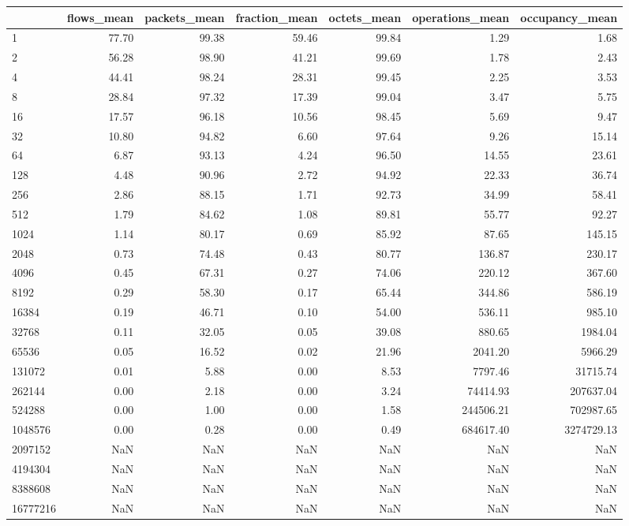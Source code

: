 \begin{tabular}{lrrrrrr}
\toprule
 & flows_mean & packets_mean & fraction_mean & octets_mean & operations_mean & occupancy_mean \\
\midrule
1 & 77.70 & 99.38 & 59.46 & 99.84 & 1.29 & 1.68 \\
2 & 56.28 & 98.90 & 41.21 & 99.69 & 1.78 & 2.43 \\
4 & 44.41 & 98.24 & 28.31 & 99.45 & 2.25 & 3.53 \\
8 & 28.84 & 97.32 & 17.39 & 99.04 & 3.47 & 5.75 \\
16 & 17.57 & 96.18 & 10.56 & 98.45 & 5.69 & 9.47 \\
32 & 10.80 & 94.82 & 6.60 & 97.64 & 9.26 & 15.14 \\
64 & 6.87 & 93.13 & 4.24 & 96.50 & 14.55 & 23.61 \\
128 & 4.48 & 90.96 & 2.72 & 94.92 & 22.33 & 36.74 \\
256 & 2.86 & 88.15 & 1.71 & 92.73 & 34.99 & 58.41 \\
512 & 1.79 & 84.62 & 1.08 & 89.81 & 55.77 & 92.27 \\
1024 & 1.14 & 80.17 & 0.69 & 85.92 & 87.65 & 145.15 \\
2048 & 0.73 & 74.48 & 0.43 & 80.77 & 136.87 & 230.17 \\
4096 & 0.45 & 67.31 & 0.27 & 74.06 & 220.12 & 367.60 \\
8192 & 0.29 & 58.30 & 0.17 & 65.44 & 344.86 & 586.19 \\
16384 & 0.19 & 46.71 & 0.10 & 54.00 & 536.11 & 985.10 \\
32768 & 0.11 & 32.05 & 0.05 & 39.08 & 880.65 & 1984.04 \\
65536 & 0.05 & 16.52 & 0.02 & 21.96 & 2041.20 & 5966.29 \\
131072 & 0.01 & 5.88 & 0.00 & 8.53 & 7797.46 & 31715.74 \\
262144 & 0.00 & 2.18 & 0.00 & 3.24 & 74414.93 & 207637.04 \\
524288 & 0.00 & 1.00 & 0.00 & 1.58 & 244506.21 & 702987.65 \\
1048576 & 0.00 & 0.28 & 0.00 & 0.49 & 684617.40 & 3274729.13 \\
2097152 & NaN & NaN & NaN & NaN & NaN & NaN \\
4194304 & NaN & NaN & NaN & NaN & NaN & NaN \\
8388608 & NaN & NaN & NaN & NaN & NaN & NaN \\
16777216 & NaN & NaN & NaN & NaN & NaN & NaN \\
\bottomrule
\end{tabular}
